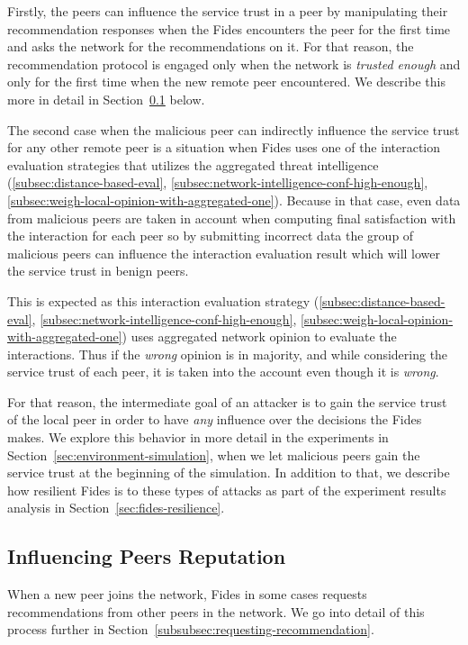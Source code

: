Firstly, the peers can influence the service trust in a peer by manipulating their recommendation responses when the Fides encounters the peer for the first time and asks the network for the recommendations on it.
For that reason, the recommendation protocol is engaged only when the network is \textit{trusted enough} and only for the first time when the new remote peer encountered. We describe this more in detail in Section~\ref{subsec:influencing-peers-reputation} below.

The second case when the malicious peer can indirectly influence the service trust for any other remote peer is a situation when Fides uses one of the interaction evaluation strategies that utilizes the aggregated threat intelligence (\ref{subsec:distance-based-eval}, \ref{subsec:network-intelligence-conf-high-enough}, \ref{subsec:weigh-local-opinion-with-aggregated-one}).
Because in that case, even data from malicious peers are taken in account when computing final satisfaction with the interaction for each peer so by submitting incorrect data the group of malicious peers can influence the interaction evaluation result which will lower the service trust in benign peers.

This is expected as this interaction evaluation strategy (\ref{subsec:distance-based-eval}, \ref{subsec:network-intelligence-conf-high-enough}, \ref{subsec:weigh-local-opinion-with-aggregated-one}) uses aggregated network opinion to evaluate the interactions.
Thus if the \textit{wrong} opinion is in majority, and while considering the service trust of each peer, it is taken into the account even though it is \textit{wrong}.

For that reason, the intermediate goal of an attacker is to gain the service trust of the local peer in order to have \textit{any} influence over the decisions the Fides makes.
We explore this behavior in more detail in the experiments in Section~\ref{sec:environment-simulation}, when we let malicious peers gain the service trust at the beginning of the simulation. In addition to that, we describe how resilient Fides is to these types of attacks as part of the experiment results analysis in Section~\ref{sec:fides-resilience}.

\subsection{Influencing Peers Reputation}
\label{subsec:influencing-peers-reputation}
When a new peer joins the network, Fides in some cases requests recommendations from other peers in the network.
We go into detail of this process further in Section~\ref{subsubsec:requesting-recommendation}.

